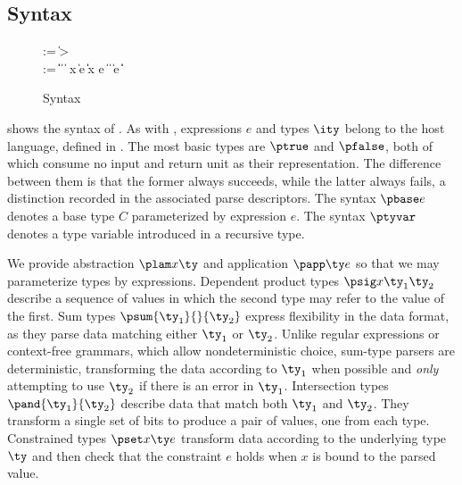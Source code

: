 \subsection{\ddc{} Syntax}
\begin{figure}
{\small
\begin{bnf}
   \meta{\gk} \::= \kty \| \ity \-> \gk 
                               \pext{\| \gk \-> \gk} \\
   \meta{\ty} \::= 
    \ptrue\| \pfalse \|  \| 
    \plam{\var}{\ity}{\ty} \|  \nlalt
    \psig x \ty \ty \| \psum \ty e \ty \| \pand \ty \ty \|
    \pset x \ty e \| \pseq \ty {} \nlalt
    \ptyvar       \| \pmu{\ptyvar}{\ty} \| \pcompute e \ity \| \pabsorb \ty \| \pscan{\ty} 
\end{bnf}
}
\caption{\ddc{} Syntax}
\label{fig:ddc-syntax}
\end{figure}
 shows the syntax of \ddc{}. As with
\ipads{}, expressions $e$ and types $\ity$ belong to the host
language, defined in .
The most basic types are $\ptrue$ and $\pfalse$, both of which consume
no input and return unit as their
representation.  The difference between them is that
the former always succeeds, while the latter always fails, a
distinction recorded in the associated parse descriptors.
The syntax $\pbase e$ denotes a base type $C$ parameterized by 
expression $e$. The syntax $\ptyvar$ denotes a type variable
introduced in a recursive type.

We provide abstraction $\plam x {} \ty$ and application
$\papp \ty e$ so that we may parameterize types by expressions.
Dependent product types $\psig x {\ty_1} {\ty_2}$ describe a sequence
of values in which the second type may refer to the value of the first.
Sum types $\psum {\ty_1} {} {\ty_2}$
express flexibility in the data format, as they parse
data matching either $\ty_1$ or $\ty_2$. Unlike regular expressions or
context-free grammars, which allow nondeterministic choice,
sum-type parsers
are deterministic, transforming the data according to $\ty_1$
when possible and {\it only} attempting to
use $\ty_2$ if there is an error in $\ty_1$. Intersection types
$\pand {\ty_1} {\ty_2}$ describe data that match both $\ty_1$ and
$\ty_2$. They transform a single set of bits to produce
a pair of values, one from each type. Constrained types $\pset x \ty e$
transform data according to the underlying type $\ty$ and
then check that the constraint $e$ holds when $x$ is bound to the parsed value.


